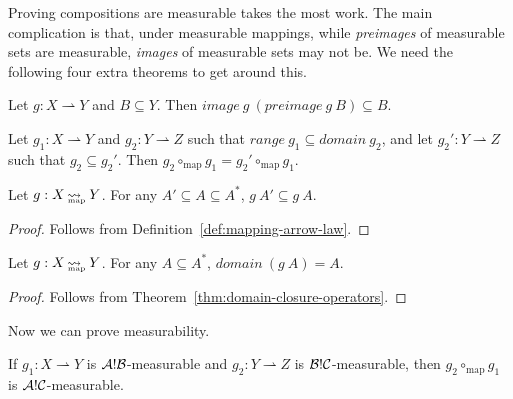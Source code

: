 \documentclass[preprint]{sigplanconf}
\newcommand{\arrow}{\rightsquigarrow}
\newcommand{\pto}{\rightharpoonup}
\newcommand{\map}{_\mathrm{map}}
\DeclareMathOperator{\mapto}{\arrow_{\mspace{-21mu}\map}}
\begin{document}
Proving compositions are measurable takes the most work.
The main complication is that, under measurable mappings, while \emph{preimages} of measurable sets are measurable, \emph{images} of measurable sets may not be.
We need the following four extra theorems to get around this.

\begin{lemma}
Let $g : X \pto Y$ and $B \subseteq Y$. Then $image~g~(preimage~g~B) \subseteq B$.
\label{lem:images-of-preimages}
\end{lemma}

\begin{lemma}
Let $g_1 : X \pto Y$ and $g_2 : Y \pto Z$ such that $range~g_1 \subseteq domain~g_2$, and let $g_2' : Y \pto Z$ such that $g_2 \subseteq g_2'$.
Then $g_2 \circ\map g_1 = g_2' \circ\map g_1$.
\label{lem:composition-expansion}
\end{lemma}

\begin{theorem}
Let $g : X \mapto Y$.
For any $A' \subseteq A \subseteq A^*$, $g~A' \subseteq g~A$.
\label{thm:mapping-arrow-monotonicity}
\end{theorem}
\begin{proof}
Follows from Definition~\ref{def:mapping-arrow-law}.
\end{proof}

\begin{theorem}
Let $g : X \mapto Y$. For any $A \subseteq A^*$, $domain~(g~A) = A$.
\label{thm:maximal-domain-subsets}
\end{theorem}
\begin{proof}
Follows from Theorem~\ref{thm:domain-closure-operators}.
\end{proof}

Now we can prove measurability.

\begin{lemma}[measurability under $\circ\map$]
If $g_1 : X \pto Y$ is $\mathcal{A}!\mathcal{B}$-measurable and $g_2 : Y \pto Z$ is $\mathcal{B}!\mathcal{C}$-measurable, then $g_2 \circ\map g_1$ is $\mathcal{A}!\mathcal{C}$-measurable.
\label{lem:compositions-are-measurable}
\end{lemma}
\end{document}
